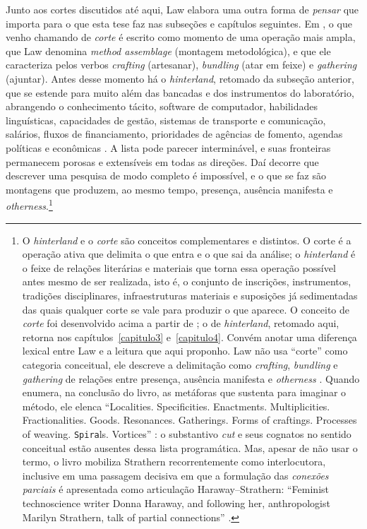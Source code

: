 Junto aos cortes discutidos até aqui, Law elabora uma outra forma de \textit{pensar} que importa para o que esta tese faz nas subseções e capítulos seguintes. Em \textcite{Law2004After}, o que venho chamando de \textit{corte} é escrito como momento de uma operação mais ampla, que Law denomina \textit{method assemblage} (montagem metodológica), e que ele caracteriza pelos verbos \textit{crafting} (artesanar), \textit{bundling} (atar em feixe) e \textit{gathering} (ajuntar). Antes desse momento há o \textit{hinterland}, retomado da subseção anterior, que se estende para muito além das bancadas e dos instrumentos do laboratório, abrangendo o conhecimento tácito, software de computador, habilidades linguísticas, capacidades de gestão, sistemas de transporte e comunicação, salários, fluxos de financiamento, prioridades de agências de fomento, agendas políticas e econômicas \parencite[pp.~40--41]{Law2004After}. A lista pode parecer interminável, e suas fronteiras permanecem porosas e extensíveis em todas as direções. Daí decorre que descrever uma pesquisa de modo completo é impossível, e o que se faz são montagens que produzem, ao mesmo tempo, presença, ausência manifesta e \textit{otherness}.\footnote{O \textit{hinterland} e o \textit{corte} são conceitos complementares e distintos. O corte é a operação ativa que delimita o que entra e o que sai da análise; o \textit{hinterland} é o feixe de relações literárias e materiais que torna essa operação possível antes mesmo de ser realizada, isto é, o conjunto de inscrições, instrumentos, tradições disciplinares, infraestruturas materiais e suposições já sedimentadas das quais qualquer corte se vale para produzir o que aparece. O conceito de \textit{corte} foi desenvolvido acima a partir de \textcite{strathern2011cortando}; o de \textit{hinterland}, retomado aqui, retorna nos capítulos~\ref{capitulo3} e~\ref{capitulo4}. Convém anotar uma diferença lexical entre Law e a leitura que aqui proponho. Law não usa \enquote{corte} como categoria conceitual, ele descreve a delimitação como \textit{crafting}, \textit{bundling} e \textit{gathering} de relações entre presença, ausência manifesta e \textit{otherness} \parencite[p.~14, pp.~83--85, e glossário, p.~160]{Law2004After}. Quando enumera, na conclusão do livro, as metáforas que sustenta para imaginar o método, ele elenca \enquote{Localities. Specificities. Enactments. Multiplicities. Fractionalities. Goods. Resonances. Gatherings. Forms of craftings. Processes of weaving. \texttt{Spira}ls. Vortices} \parencite[p.~155]{Law2004After}: o substantivo \textit{cut} e seus cognatos no sentido conceitual estão ausentes dessa lista programática. Mas, apesar de não usar o termo, o livro mobiliza Strathern recorrentemente como interlocutora, inclusive em uma passagem decisiva em que a formulação das \textit{conexões parciais} é apresentada como articulação Haraway--Strathern: \enquote{Feminist technoscience writer Donna Haraway, and following her, anthropologist Marilyn Strathern, talk of partial connections} \parencite[p.~64]{Law2004After}.
}

